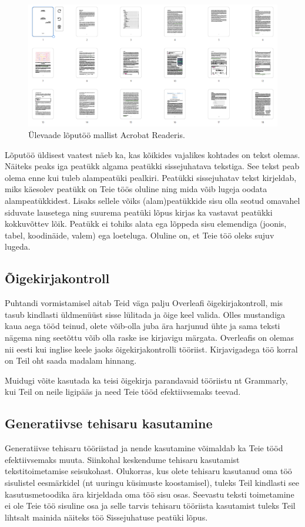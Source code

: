 \begin{figure}[t]
    \centering
    \includegraphics[width=\textwidth]{joonised/Joonis6-AcrobatReaderKuva.png}
    \caption{Ülevaade lõputöö mallist Acrobat Readeris.}
    \label{fig:acrobatReaderÜlevaade}
\end{figure}
Lõputöö üldisest vaatest näeb ka, kas kõikides vajalikes kohtades on tekst olemas. Näiteks peaks iga peatükk algama peatükki sissejuhatava tekstiga. See tekst peab olema enne kui tuleb alampeatüki pealkiri. Peatükki sissejuhatav tekst kirjeldab, miks käesolev peatükk on Teie töös oluline ning mida võib lugeja oodata alampeatükkidest. Lisaks sellele võiks (alam)peatükkide sisu olla seotud omavahel siduvate lausetega ning suurema peatüki lõpus kirjas ka vastavat peatükki kokkuvõttev lõik. Peatükk ei tohiks alata ega lõppeda sisu elemendiga (joonis, tabel, koodinäide, valem) ega loeteluga. Oluline on, et Teie töö oleks sujuv lugeda.

\subsection{Õigekirjakontroll}
Puhtandi vormistamisel aitab Teid väga palju Overleafi õigekirjakontroll, mis tasub kindlasti üldmenüüst sisse lülitada ja õige keel valida. Olles mustandiga kaua aega tööd teinud, olete võib-olla juba ära harjunud ühte ja sama teksti nägema ning seetõttu võib olla raske ise kirjavigu märgata. Overleafis on olemas nii eesti kui inglise keele jaoks õigekirjakontrolli tööriist. Kirjavigadega töö korral on Teil oht saada madalam hinnang.

Muidugi võite kasutada ka teisi õigekirja parandavaid tööriistu nt Grammarly, kui Teil on neile ligipääs ja need Teie tööd efektiivsemaks teevad.

\subsection{Generatiivse tehisaru kasutamine}
Generatiivse tehisaru tööriistad ja nende kasutamine võimaldab ka Teie tööd efektiivsemaks muuta. Siinkohal keskendume tehisaru kasutamist tekstitoimetamise seisukohast. Olukorras, kus olete tehisaru kasutanud oma töö sisulistel eesmärkidel (nt uuringu küsimuste koostamisel), tuleks Teil kindlasti see kasutusmetoodika ära kirjeldada oma töö sisu osas. Seevastu teksti toimetamine ei ole Teie töö sisuline osa ja selle tarvis tehisaru tööriista kasutamist tuleks Teil lihtsalt mainida näiteks töö Sissejuhatuse peatüki lõpus.


